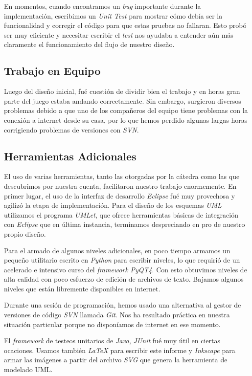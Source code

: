 \documentclass[a4paper,12pt,titlepage]{article}
\begin{document}
En momentos, cuando encontramos un \emph{bug} importante durante la implementación, escribimos un \emph{Unit Test} para mostrar cómo debía ser la funcionalidad y corregir el código para que estas pruebas no fallaran. Esto probó ser muy eficiente y necesitar escribir el \emph{test} nos ayudaba a entender aún más claramente el funcionamiento del flujo de nuestro diseño.

\subsection{Trabajo en Equipo}

Luego del diseño inicial, fué cuestión de dividir bien el trabajo y en horas gran parte del juego estaba andando correctamente. Sin embargo, surgieron diversos problemas debido a que uno de los compañeros del equipo tiene problemas con la conexión a internet desde su casa, por lo que hemos perdido algunas largas horas corrigiendo problemas de versiones con \emph{SVN}.

\subsection{Herramientas Adicionales}

El uso de varias herramientas, tanto las otorgadas por la cátedra como las que descubrimos por nuestra cuenta, facilitaron nuestro trabajo enormemente. En primer lugar, el uso de la interfaz de desarrollo \emph{Eclipse} fué muy provechosa y agilizó la etapa de implementación. Para el diseño de los esquemas \emph{UML} utilizamos el programa \emph{UMLet}, que ofrece herramientas básicas de integración con \emph{Eclipse} que en última instancia, terminamos despreciando en pro de nuestro propio diseño.

Para el armado de algunos niveles adicionales, en poco tiempo armamos un pequeño utilitario escrito en \emph{Python} para escribir niveles, lo que requirió de un acelerado e intensivo curso del \emph{framework} \emph{PyQT4}. Con esto obtuvimos niveles de alta calidad con poco esfuerzo de edición de archivos de texto. Bajamos algunos niveles que están libremente disponibles en internet.

Durante una sesión de programación, hemos usado una alternativa al gestor de versiones de código \emph{SVN} llamada \emph{Git}. Nos ha resultado práctica en nuestra situación particular porque no disponíamos de internet en ese momento.

El \emph{framework} de testeos unitarios de \emph{Java}, \emph{JUnit} fué muy útil en ciertas ocaciones. Usamos también \emph{\LaTeX} para escribir este informe y \emph{Inkscape} para armar las imágenes a partir del archivo \emph{SVG} que genera la herramienta de modelado UML.
\end{document}
